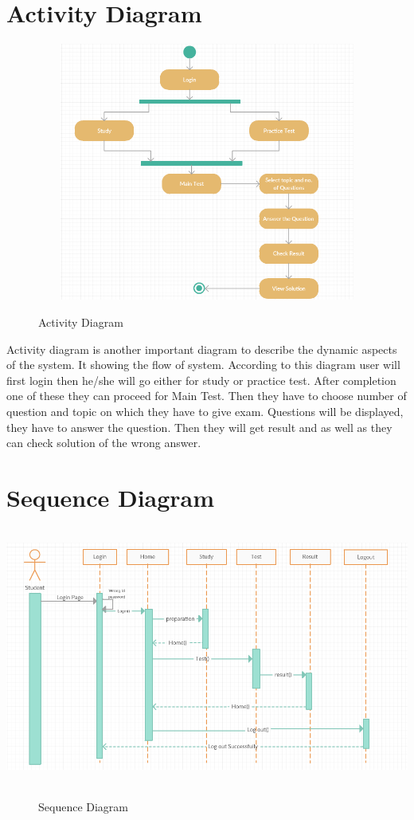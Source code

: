 \section{Activity Diagram}
\begin{center}
	\includegraphics[width=13.5cm,
	height=8.5cm]{activity.png}
	\begin{figure}[h!]
		\centering
		\caption{Activity Diagram}%
	\end{figure}
\end{center}
Activity diagram is another important diagram to describe the dynamic aspects of the system. It showing the flow of system. According to this diagram user will first login then he/she will go either for study or practice test. After completion one of these they can proceed for Main Test. Then they have to choose number of question and topic on which they have to give exam. Questions will be displayed, they have to answer the question. Then they will get result and as well as they can check solution of the wrong answer.
\section{Sequence Diagram}
\begin{center}
	\includegraphics[width=13.5cm,
	height=8.5cm]{sequence.png}
	\begin{figure}[h!]
		\centering
		\caption{Sequence Diagram}%
	\end{figure}
\end{center}
